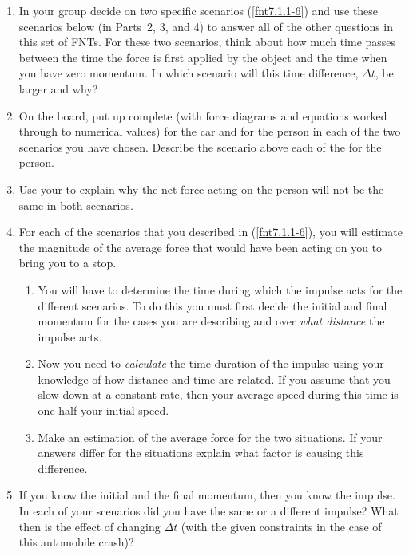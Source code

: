 \begin{enumerate}
	\item In your group decide on two specific scenarios (\ref{fnt7.1.1-6}) and use these scenarios below (in Parts~2, 3, and 4) to answer all of the other questions in this set of FNTs. For these two scenarios, think about how much time passes between the time the force is first applied by the object and the time when you have zero momentum. In which scenario will this time difference, $\Delta t$, be larger and why?
	
	\item  On the board, put up complete \pcharts{} (with force diagrams and equations worked through to numerical values) for the car and for the person in each of the two scenarios you have chosen. Describe the scenario above each of the \pcharts{} for the person.
	
	\item Use your \pcharts{} to explain why the net force acting on the person will not be the same in both scenarios.
	
	\item For each of the scenarios that you described in (\ref{fnt7.1.1-6}), you will estimate the magnitude of the average force that would have been acting on you to bring you to a stop.
	\begin{enumerate}
		\item You will have to determine the time during which the impulse acts for the different scenarios. To do this you must first decide the initial and final momentum for the cases you are describing and over \emph{what distance} the impulse acts.
		
		\item Now you need to \emph{calculate} the time duration of the impulse using your knowledge of how distance and time are related. If you assume that you slow down at a constant rate, then your average speed during this time is one-half your initial speed.
		
		\item Make an estimation of the average force for the two situations. If your answers differ for the situations explain what factor is causing this difference.
	\end{enumerate}
	
	\item If you know the initial and the final momentum, then you know the impulse. In each of your scenarios did you have the same or a different impulse? What then is the effect of changing $\Delta t$ (with the given constraints in the case of this automobile crash)?
\end{enumerate}


